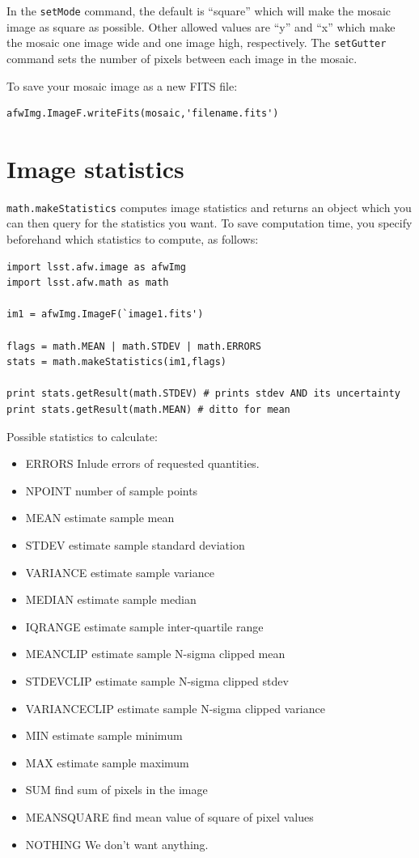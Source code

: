 In the \texttt{setMode} command, the default is ``square'' which will
make the mosaic image as square as possible.  Other allowed values are
``y'' and ``x'' which make the mosaic one image wide and one image
high, respectively.  The \texttt{setGutter} command sets the number of
pixels between each image in the mosaic.

To save your mosaic image as a new FITS file:

\begin{verbatim}
afwImg.ImageF.writeFits(mosaic,'filename.fits')
\end{verbatim}


\section{Image statistics}

\texttt{math.makeStatistics} computes image statistics and returns an
object which you can then query for the statistics you want.  To save
computation time, you specify beforehand which statistics to compute,
as follows:

\begin{verbatim}
import lsst.afw.image as afwImg
import lsst.afw.math as math

im1 = afwImg.ImageF(`image1.fits')

flags = math.MEAN | math.STDEV | math.ERRORS 
stats = math.makeStatistics(im1,flags)

print stats.getResult(math.STDEV) # prints stdev AND its uncertainty
print stats.getResult(math.MEAN) # ditto for mean

\end{verbatim}

Possible statistics to calculate:
\begin{itemize}
\item ERRORS     Inlude errors of requested quantities.
\item NPOINT     number of sample points
\item MEAN     estimate sample mean
\item STDEV     estimate sample standard deviation
\item VARIANCE     estimate sample variance
\item MEDIAN     estimate sample median
\item IQRANGE     estimate sample inter-quartile range
\item MEANCLIP     estimate sample N-sigma clipped mean
\item STDEVCLIP     estimate sample N-sigma clipped stdev
\item VARIANCECLIP     estimate sample N-sigma clipped variance
\item MIN     estimate sample minimum
\item MAX     estimate sample maximum
\item SUM     find sum of pixels in the image
\item MEANSQUARE     find mean value of square of pixel values
\item NOTHING     We don't want anything.
\end{itemize}

